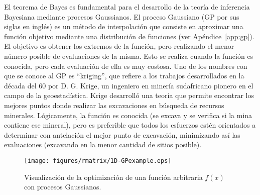El teorema de Bayes es fundamental para el desarrollo de la teoría de 
inferencia Bayesiana mediante procesos Gaussianos. 
El proceso Gaussiano (GP por sus siglas en inglés) es un método de 
interpolación que consiste en aproximar una función objetivo mediante 
una distribución de funciones (ver Apéndice~\ref{app:gp}). El objetivo 
es obtener los extremos de la función, pero realizando el menor número 
posible de evaluaciones de la misma. Esto se realiza cuando la función 
es conocida, pero cada evaluación de ella es muy costosa. Uno de los 
nombres con que se conoce al GP es ``kriging'', que refiere a los 
trabajos desarrollados en la década del 60 por D. G. Krige, un ingeniero 
en minería sudafricano pionero en el campo de la geoestadística. Krige 
desarrolló una teoría que permite encontrar los mejores puntos donde 
realizar las excavaciones en búsqueda de recursos minerales. 
Lógicamente, la función es conocida (se excava y se verifica si la mina 
contiene ese mineral), pero es preferible que todos los esfuerzos estén 
orientados a determinar con antelación el mejor punto de excavación, 
minimizando así las evaluaciones (excavando en la menor cantidad de 
sitios posible).

\begin{figure}
\centering
\texttt{[image: figures/rmatrix/1D-GPexample.eps]} 
\caption{Visualización de la optimización de una función arbitraria 
$f(x)$ con procesos Gaussianos.}
\label{fig:visualizacion-gp}
\end{figure}

